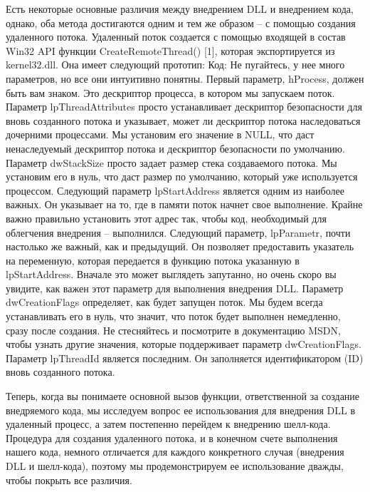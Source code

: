 \documentclass[12pt]{book}
\begin{document}
Есть некоторые основные различия между внедрением DLL и внедрением кода, однако, оба метода достигаются одним и тем же образом – с помощью создания удаленного потока. Удаленный поток создается с помощью входящей в состав Win32 API функции CreateRemoteThread() [1], которая экспортируется из kernel32.dll. Она имеет следующий прототип:
Код:
Не пугайтесь, у нее много параметров, но все они интуитивно понятны. Первый параметр, hProcess, должен быть вам знаком. Это дескриптор процесса, в котором мы запускаем поток. Параметр lpThreadAttributes просто устанавливает дескриптор безопасности для вновь созданного потока и указывает, может ли дескриптор потока наследоваться дочерними процессами. Мы установим его значение в NULL, что даст ненаследуемый дескриптор потока и дескриптор безопасности по умолчанию. Параметр dwStackSize просто задает размер стека создаваемого потока. Мы установим его в нуль, что даст размер по умолчанию, который уже используется процессом. Следующий параметр lpStartAddress является одним из наиболее важных. Он указывает на то, где в памяти поток начнет свое выполнение. Крайне важно правильно установить этот адрес так, чтобы код, необходимый для облегчения внедрения – выполнился. Следующий параметр, lpParametr, почти настолько же важный, как и предыдущий. Он позволяет предоставить указатель на переменную, которая передается в функцию потока указанную в lpStartAddress. Вначале это может выглядеть запутанно, но очень скоро вы увидите, как важен этот параметр для выполнения внедрения DLL. Параметр dwCreationFlags определяет, как будет запущен поток. Мы будем всегда устанавливать его в нуль, что значит, что поток будет выполнен немедленно, сразу после создания. Не стесняйтесь и посмотрите в документацию MSDN, чтобы узнать другие значения, которые поддерживает параметр dwCreationFlags. Параметр lpThreadId является последним. Он заполняется идентификатором (ID) вновь созданного потока.

Теперь, когда вы понимаете основной вызов функции, ответственной за создание внедряемого кода, мы исследуем вопрос ее использования для внедрения DLL в удаленный процесс, а затем постепенно перейдем к внедрению шелл-кода. Процедура для создания удаленного потока, и в конечном счете выполнения нашего кода, немного отличается для каждого конкретного случая (внедрения DLL и шелл-кода), поэтому мы продемонстрируем ее использование дважды, чтобы покрыть все различия.
\end{document}
